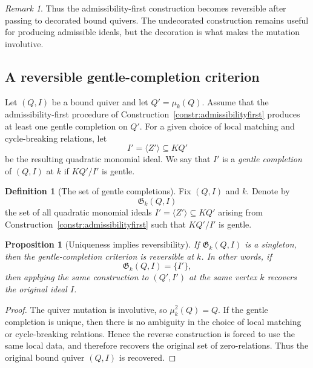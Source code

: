 \documentclass[11pt]{article}
\theoremstyle{plain}
\newtheorem{proposition}[theorem]{Proposition}
\theoremstyle{definition}
\newtheorem{definition}[theorem]{Definition}
\theoremstyle{remark}
\newtheorem{remark}[theorem]{Remark}
\begin{document}
\begin{remark}
Thus the admissibility-first construction becomes reversible after passing to
decorated bound quivers.  The undecorated construction remains useful for
producing admissible ideals, but the decoration is what makes the mutation
involutive.
\end{remark}

\subsection{A reversible gentle-completion criterion}\label{subsec:reversible-gentle-completion}

Let \((Q,I)\) be a bound quiver and let \(Q'=\mu_k(Q)\).  Assume that the
admissibility-first procedure of Construction~\ref{constr:admissibilityfirst}
produces at least one gentle completion on \(Q'\).  For a given choice of local
matching and cycle-breaking relations, let
\[
I'=\langle Z'\rangle\subseteq KQ'
\]
be the resulting quadratic monomial ideal.  We say that \(I'\) is a
\emph{gentle completion} of \((Q,I)\) at \(k\) if \(KQ'/I'\) is gentle.

\begin{definition}[The set of gentle completions]
Fix \((Q,I)\) and \(k\).  Denote by
\[
\mathfrak G_k(Q,I)
\]
the set of all quadratic monomial ideals \(I'=\langle Z'\rangle\subseteq KQ'\)
arising from Construction~\ref{constr:admissibilityfirst} such that
\(KQ'/I'\) is gentle.
\end{definition}

\begin{proposition}[Uniqueness implies reversibility]\label{prop:uniqueness-reversible}
If \(\mathfrak G_k(Q,I)\) is a singleton, then the gentle-completion criterion
is reversible at \(k\).  In other words, if
\[
\mathfrak G_k(Q,I)=\{I'\},
\]
then applying the same construction to \((Q',I')\) at the same vertex \(k\)
recovers the original ideal \(I\).
\end{proposition}

\begin{proof}
The quiver mutation is involutive, so \(\mu_k^2(Q)=Q\).  If the gentle
completion is unique, then there is no ambiguity in the choice of local
matching or cycle-breaking relations.  Hence the reverse construction is forced
to use the same local data, and therefore recovers the original set of
zero-relations.  Thus the original bound quiver \((Q,I)\) is recovered.
\end{proof}
\end{document}

